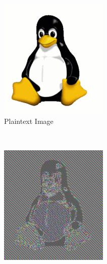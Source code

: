 \begin{figure}[b]
        \centering
        \begin{subfigure}[c]{0.27\textwidth}
                \centering
                \includegraphics[width=\textwidth]{images/Tux.jpg}
                \caption{Plaintext Image}
                \label{fig:ECB_Exemple_plaintext}
        \end{subfigure}
        ~
        \begin{subfigure}[c]{0.27\textwidth}
                \centering
                \includegraphics[width=\textwidth]{images/Tux_ecb.jpg}

\end{subfigure}
\end{figure}
